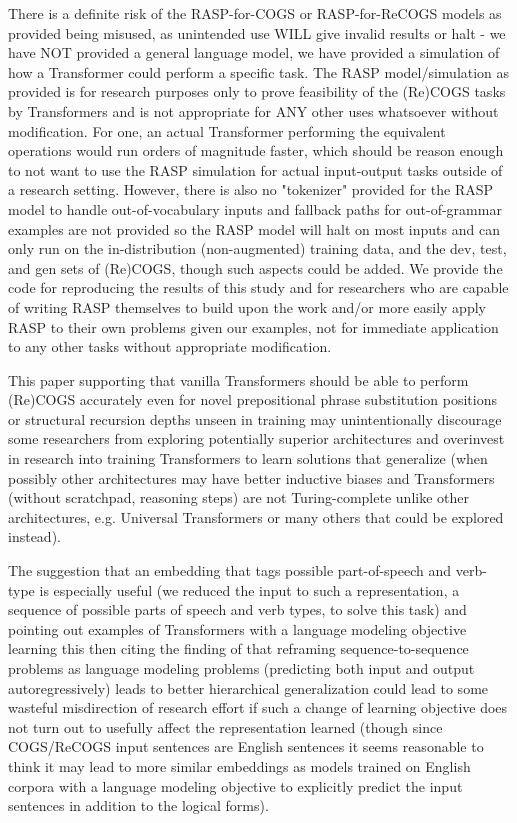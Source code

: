 \documentclass[11pt]{article}
\begin{document}
There is a definite risk of the RASP-for-COGS or RASP-for-ReCOGS models as provided being misused, as unintended use WILL give invalid results or halt - we have NOT provided a general language model, we have provided a simulation of how a Transformer could perform a specific task.
The RASP model/simulation as provided is for research purposes only to prove feasibility of the (Re)COGS tasks by Transformers and is not appropriate for ANY other uses whatsoever without modification. For one, an actual Transformer performing the equivalent operations would run orders of magnitude faster, which should be reason enough to not want to use the RASP simulation for actual input-output tasks outside of a research setting. However, there is also no "tokenizer" provided for the RASP model to handle out-of-vocabulary inputs and fallback paths for out-of-grammar examples are not provided so the RASP model will halt on most inputs and can only run on the in-distribution (non-augmented) training data, and the dev, test, and gen sets of (Re)COGS, though such aspects could be added. We provide the code for reproducing the results of this study and for researchers who are capable of writing RASP themselves to build upon the work and/or more easily apply RASP to their own problems given our examples, not for immediate application to any other tasks without appropriate modification.

This paper supporting that vanilla Transformers should be able to perform (Re)COGS accurately even for novel prepositional phrase substitution positions or structural recursion depths unseen in training may unintentionally discourage some researchers from exploring potentially superior architectures and overinvest in research into training Transformers to learn solutions that generalize (when possibly other architectures may have better inductive biases and Transformers (without scratchpad, reasoning steps) are not Turing-complete \cite{merrill2024expressivepowertransformerschain} \cite{delétang2023neuralnetworkschomskyhierarchy} \cite{Strobl2024} unlike other architectures, e.g. Universal Transformers \cite{Dehghani2019} or many others that could be explored instead).

The suggestion that an embedding that tags possible part-of-speech and verb-type is especially useful (we reduced the input to such a representation, a sequence of possible parts of speech and verb types, to solve this task) and pointing out examples of Transformers with a language modeling objective learning this \cite{tenney2019bertrediscoversclassicalnlp} then citing the finding of \cite{10.1162/tacl_a_00733} that reframing sequence-to-sequence problems as language modeling problems (predicting both input and output autoregressively) leads to better hierarchical generalization could lead to some wasteful misdirection of research effort if such a change of learning objective does not turn out to usefully affect the representation learned (though since COGS/ReCOGS input sentences are English sentences it seems reasonable to think it may lead to more similar embeddings as models trained on English corpora with a language modeling objective to explicitly predict the input sentences in addition to the logical forms).
\end{document}
